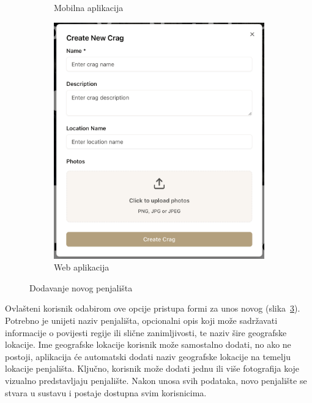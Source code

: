 \begin{figure}[H]
\begin{subfigure}[b]{0.31\textwidth}
        \caption{Mobilna aplikacija}
        \label{fig:dodavanje_lokacije_mob}
    \end{subfigure}
    \hfill
    \begin{subfigure}[b]{0.6\textwidth}
        \centering
        \includegraphics[width=\textwidth]{images/implementacija/web/editing-options/create-crag.png}
        \caption{Web aplikacija}
        \label{fig:dodavanje_lokacije_web}
    \end{subfigure}
    \caption{Dodavanje novog penjališta}
    \label{fig:dodavanje_lokacije}
\end{figure}

Ovlašteni korisnik odabirom ove opcije pristupa formi za unos novog (slika~\ref{fig:dodavanje_lokacije}). Potrebno je unijeti naziv penjališta, opcionalni opis koji može sadržavati informacije o povijesti regije ili slične zanimljivosti, te naziv šire geografske lokacije. Ime geografske lokacije korisnik može samostalno dodati, no ako ne postoji, aplikacija će automatski dodati naziv geografske lokacije na temelju lokacije penjališta. Ključno, korisnik može dodati jednu ili više fotografija koje vizualno predstavljaju penjalište. Nakon unosa svih podataka, novo penjalište se stvara u sustavu i postaje dostupna svim korisnicima.

